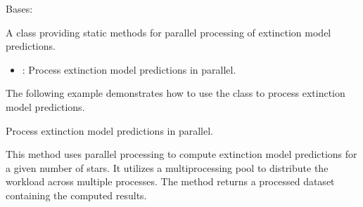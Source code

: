 \documentclass[letterpaper,10pt,english]{sphinxmanual}
\begin{document}
\begin{fulllineitems}
\label{\detokenize{ParallelProcessor:ParallelProcessor.ParallelProcessor}}
\pysigstartsignatures
{}
\pysigstopsignatures
\sphinxAtStartPar
Bases: 

\sphinxAtStartPar
A class providing static methods for parallel processing of extinction model predictions.
\begin{description}
\begin{itemize}
\item {} 
\sphinxAtStartPar
{}: Process extinction model predictions in parallel.

\end{itemize}

\sphinxAtStartPar
The following example demonstrates how to use the  class to process extinction model
predictions.

\begin{sphinxVerbatim}[commandchars=\\\{\}]
  
      
\end{sphinxVerbatim}

\end{description}

\begin{fulllineitems}
\label{\detokenize{ParallelProcessor:ParallelProcessor.ParallelProcessor.process_parallel}}
\pysigstartsignatures
{}
\pysigstopsignatures
\sphinxAtStartPar
Process extinction model predictions in parallel.
\begin{description}
\sphinxAtStartPar
This method uses parallel processing to compute extinction model predictions for a given number of stars.
It utilizes a multiprocessing pool to distribute the workload across multiple processes.
The method returns a processed dataset containing the computed results.


\end{description}
\end{fulllineitems}
\end{fulllineitems}
\end{document}
